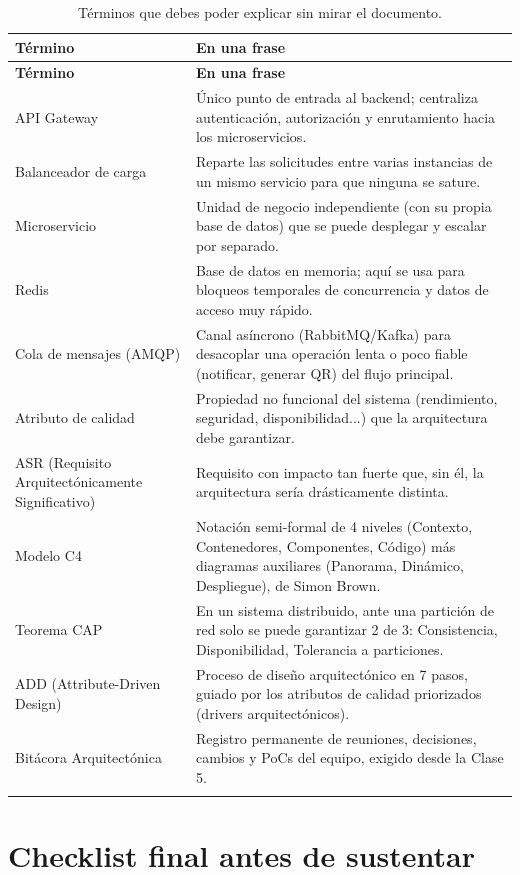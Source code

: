 \documentclass[12pt,a4paper]{article}
\begin{document}
\begin{longtable}{p{3.2cm}p{9.3cm}}
\toprule
\textbf{Término} & \textbf{En una frase}\\
\midrule
\endfirsthead
\toprule
\textbf{Término} & \textbf{En una frase}\\
\midrule
\endhead
API Gateway & Único punto de entrada al backend; centraliza autenticación, autorización y
enrutamiento hacia los microservicios.\\
Balanceador de carga & Reparte las solicitudes entre varias instancias de un mismo servicio para
que ninguna se sature.\\
Microservicio & Unidad de negocio independiente (con su propia base de datos) que se puede
desplegar y escalar por separado.\\
Redis & Base de datos en memoria; aquí se usa para bloqueos temporales de concurrencia y datos de
acceso muy rápido.\\
Cola de mensajes (AMQP) & Canal asíncrono (RabbitMQ/Kafka) para desacoplar una operación lenta o
poco fiable (notificar, generar QR) del flujo principal.\\
Atributo de calidad & Propiedad no funcional del sistema (rendimiento, seguridad, disponibilidad...)
que la arquitectura debe garantizar.\\
ASR (Requisito Arquitectónicamente Significativo) & Requisito con impacto tan fuerte que, sin él, la
arquitectura sería drásticamente distinta.\\
Modelo C4 & Notación semi-formal de 4 niveles (Contexto, Contenedores, Componentes, Código) más
diagramas auxiliares (Panorama, Dinámico, Despliegue), de Simon Brown.\\
Teorema CAP & En un sistema distribuido, ante una partición de red solo se puede garantizar 2 de 3:
Consistencia, Disponibilidad, Tolerancia a particiones.\\
ADD (Attribute-Driven Design) & Proceso de diseño arquitectónico en 7 pasos, guiado por los
atributos de calidad priorizados (drivers arquitectónicos).\\
Bitácora Arquitectónica & Registro permanente de reuniones, decisiones, cambios y PoCs del equipo,
exigido desde la Clase 5.\\
\bottomrule
\caption{Términos que debes poder explicar sin mirar el documento.}
\end{longtable}

\section{Checklist final antes de sustentar}
\end{document}
